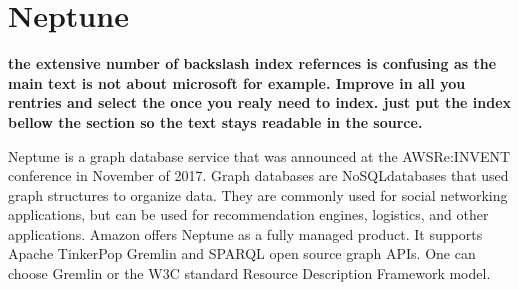 \section{Neptune}

{\bf the extensive number of backslash index refernces is confusing as the main
  text is not about microsoft for example. Improve in all you rentries
and select the once you realy need to index. just put the index bellow
the section so the text stays readable in the source.}

Neptune is a graph database service that was
announced at the AWSRe:INVENT conference in November of
2017\cite{hid-sp18-419-www-tc_neptune}. Graph databases are
NoSQLdatabases that used graph structures to organize
data\cite{hid-sp18-419-www-tp-graph-db}. They are commonly used for
social networking applications, but can be used for recommendation
engines, logistics, and other applications. Amazon
offers Neptune as a fully managed product. It supports Apache
TinkerPop Gremlin and
SPARQL open source graph APIs. One can choose Gremlin or
the W3C standard Resource Description
Framework
model\cite{hid-sp18-419-www-aws-neptune}.
